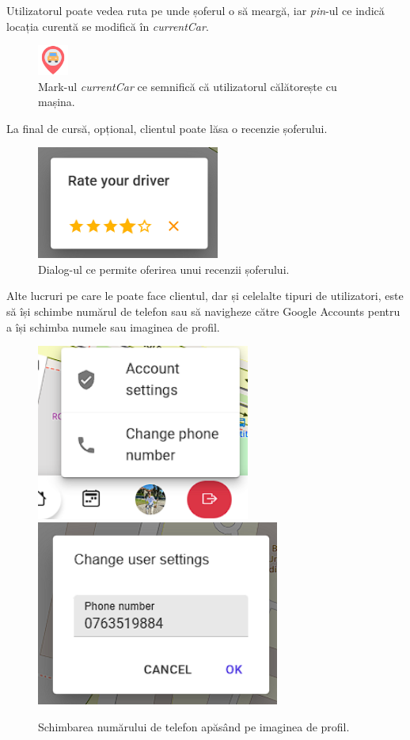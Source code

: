 Utilizatorul poate vedea ruta pe unde șoferul o să meargă, iar \textit{pin}-ul ce indică
locația curentă se modifică în \textit{currentCar}.

\begin{figure}[H]
    \centering
    \includegraphics[width=1cm]{Assets/currentCar.png}
    \caption{Mark-ul \textit{currentCar} ce semnifică că utilizatorul călătorește cu mașina.}
    \label{fig:currentCar}
\end{figure}

La final de cursă, opțional, clientul poate lăsa o recenzie șoferului.

\begin{figure}[H]
    \centering
    \includegraphics[width=6cm]{Assets/rateDriver.png}
    \caption{Dialog-ul ce permite oferirea unui recenzii șoferului.}
    \label{fig:rateDriver}
\end{figure}

Alte lucruri pe care le poate face clientul, dar și celelalte tipuri de utilizatori,
este să își schimbe numărul de telefon sau să navigheze către Google Accounts pentru a își schimba numele sau imaginea de profil.

\begin{figure}[H]
    \centering
    \includegraphics[width=7cm]{Assets/popoverUser.png}
    \includegraphics[width=8cm]{Assets/changePhoneNumber.png}
    \caption{Schimbarea numărului de telefon apăsând pe imaginea de profil.}
    \label{fig:phoneNumberChange}
\end{figure}


